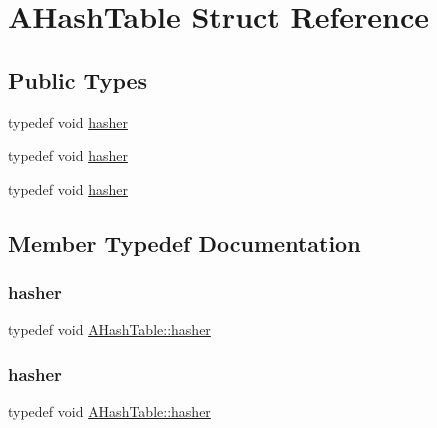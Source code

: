 \hypertarget{struct_a_hash_table}{}\section{A\+Hash\+Table Struct Reference}
\label{struct_a_hash_table}
\subsection*{Public Types}
\begin{DoxyCompactItemize}
\item 
typedef void \mbox{\hyperlink{struct_a_hash_table_af0df4ce57a783be396e80cb8df6b6259}{hasher}}
\item 
typedef void \mbox{\hyperlink{struct_a_hash_table_af0df4ce57a783be396e80cb8df6b6259}{hasher}}
\item 
typedef void \mbox{\hyperlink{struct_a_hash_table_af0df4ce57a783be396e80cb8df6b6259}{hasher}}
\end{DoxyCompactItemize}


\subsection{Member Typedef Documentation}
\mbox{\label{struct_a_hash_table_af0df4ce57a783be396e80cb8df6b6259}} 
\subsubsection{\texorpdfstring{hasher}{hasher}\hspace{0.1cm}{\footnotesize\ttfamily [1/3]}}
{\footnotesize\ttfamily typedef void \mbox{\hyperlink{struct_a_hash_table_af0df4ce57a783be396e80cb8df6b6259}{A\+Hash\+Table\+::hasher}}}

\mbox{\label{struct_a_hash_table_af0df4ce57a783be396e80cb8df6b6259}} 
\subsubsection{\texorpdfstring{hasher}{hasher}\hspace{0.1cm}{\footnotesize\ttfamily [2/3]}}
{\footnotesize\ttfamily typedef void \mbox{\hyperlink{struct_a_hash_table_af0df4ce57a783be396e80cb8df6b6259}{A\+Hash\+Table\+::hasher}}}

